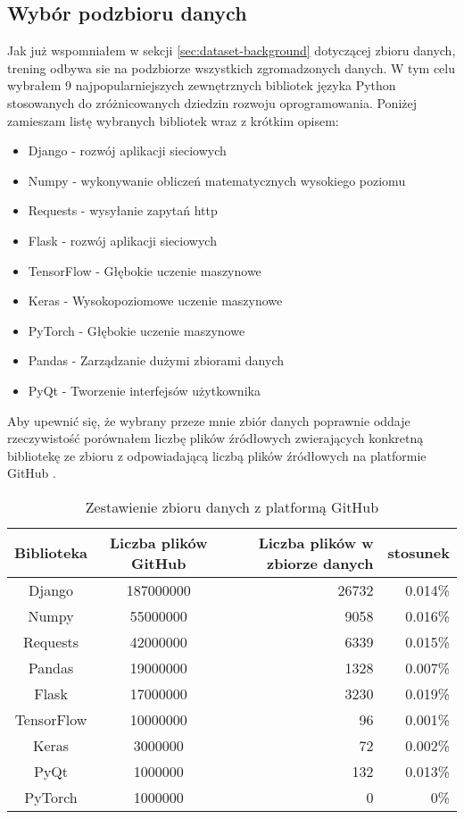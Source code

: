 \subsection{Wybór podzbioru danych}
Jak już wspomniałem w sekcji \ref{sec:dataset-background} dotyczącej zbioru danych, trening odbywa sie na podzbiorze wszystkich zgromadzonych danych. W tym celu wybrałem 9 najpopularniejszych 
zewnętrznych bibliotek języka Python stosowanych do zróżnicowanych dziedzin rozwoju oprogramowania. Poniżej zamieszam listę wybranych bibliotek wraz z krótkim opisem:
\begin{itemize}
    \item Django - rozwój aplikacji sieciowych
    \item Numpy - wykonywanie obliczeń matematycznych wysokiego poziomu
    \item Requests - wysyłanie zapytań http 
    \item Flask - rozwój aplikacji sieciowych  
    \item TensorFlow - Głębokie uczenie maszynowe
    \item Keras - Wysokopoziomowe uczenie maszynowe
    \item PyTorch - Głębokie uczenie maszynowe
    \item Pandas - Zarządzanie dużymi zbiorami danych
    \item PyQt - Tworzenie interfejsów użytkownika
\end{itemize} 
Aby upewnić się, że wybrany przeze mnie zbiór danych poprawnie oddaje rzeczywistość porównałem liczbę plików źródłowych zwierających konkretną bibliotekę ze zbioru z odpowiadającą 
liczbą plików źródłowych na platformie GitHub \cite{github}. 
\begin{table}[!h] \centering
    \caption{Zestawienie zbioru danych z platformą GitHub}
    \label{tab:dataset-compare}
    
    \begin{tabular} {| c | c | r | r |} \hline
        Biblioteka & Liczba plików GitHub & Liczba plików w zbiorze danych & stosunek\\\hline\hline
        Django & 187000000 & 26732 & 0.014\% \\\hline
        Numpy & 55000000 & 9058 & 0.016\% \\ \hline
        Requests & 42000000 & 6339 & 0.015\%\\ \hline
        Pandas & 19000000 & 1328 & 0.007\%\\ \hline
        Flask & 17000000 & 3230 & 0.019\% \\ \hline
        TensorFlow & 10000000 & 96 & 0.001\%\\ \hline
        Keras & 3000000& 72 & 0.002\%\\ \hline
        PyQt & 1000000 & 132 & 0.013\%\\ \hline
        PyTorch & 1000000 & 0 & 0\%\\ \hline
    \end{tabular}
\end{table}

